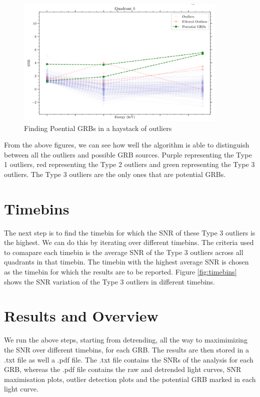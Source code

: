 \documentclass[11pt]{book} %
\begin{document}
\newpage

\begin{figure}[H]
    \centering
    \includegraphics[width=0.9\textwidth]{Pictures/snroutliersenergy.png}
    \caption{Finding Poential GRBs in a haystack of outliers}
\end{figure}

From the above figures, we can see how well the algorithm is able to distinguish between all the outliers and possible GRB sources. Purple representing the Type 1 outliers, red representing the Type 2 outliers and green representing the Type 3 outliers. The Type 3 outliers are the only ones that are potential GRBs.

\section{Timebins}

The next step is to find the timebin for which the SNR of these Type 3 outliers is the highest. We can do this by iterating over different timebins. The criteria used to comapare each timebin is the average SNR of the Type 3 outliers across all quadrants in that timebin. The timebin with the highest average SNR is chosen as the timebin for which the results are to be reported. Figure \ref{fig:timebins} shows the SNR variation of the Type 3 outliers in different timebins.

\section{Results and Overview}

We run the above steps, starting from detrending, all the way to maximimizing the SNR over different timebins, for each GRB. The results are then stored in a .txt file as well a .pdf file. The .txt file contains the SNRs of the analysis for each GRB, whereas the .pdf file contains the raw and detrended light curves, SNR maximisation plots, outlier detection plots and the potential GRB marked in each light curve.
\end{document}
